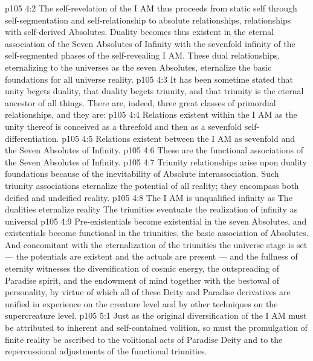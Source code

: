 \vs p105 4:2 The self\hyp{}revelation of the I AM thus proceeds from static self through self\hyp{}segmentation and self\hyp{}relationship to absolute relationships, relationships with self\hyp{}derived Absolutes. Duality becomes thus existent in the eternal association of the Seven Absolutes of Infinity with the sevenfold infinity of the self\hyp{}segmented phases of the self\hyp{}revealing I AM. These dual relationships, eternalizing to the universes as the seven Absolutes, eternalize the basic foundations for all universe reality.
\vs p105 4:3 It has been sometime stated that unity begets duality, that duality begets triunity, and that triunity is the eternal ancestor of all things. There are, indeed, three great classes of primordial relationships, and they are:
\vs p105 4:4 \bibnobreakspace {} Relations existent within the I AM as the unity thereof is conceived as a threefold and then as a sevenfold self\hyp{}differentiation.
\vs p105 4:5 \bibnobreakspace {} Relations existent between the I AM as sevenfold and the Seven Absolutes of Infinity.
\vs p105 4:6 \bibnobreakspace {} These are the functional associations of the Seven Absolutes of Infinity.
\vs p105 4:7 \pc Triunity relationships arise upon duality foundations because of the inevitability of Absolute interassociation. Such triunity associations eternalize the potential of all reality; they encompass both deified and undeified reality.
\vs p105 4:8 The I AM is unqualified infinity as  The dualities eternalize reality  The triunities eventuate the realization of infinity as universal 
\vs p105 4:9 Pre\hyp{}existentials become existential in the seven Absolutes, and existentials become functional in the triunities, the basic association of Absolutes. And concomitant with the eternalization of the triunities the universe stage is set --- the potentials are existent and the actuals are present --- and the fullness of eternity witnesses the diversification of cosmic energy, the outspreading of Paradise spirit, and the endowment of mind together with the bestowal of personality, by virtue of which all of these Deity and Paradise derivatives are unified in experience on the creature level and by other techniques on the supercreature level.
\vs p105 5:1 Just as the original diversification of the I AM must be attributed to inherent and self\hyp{}contained volition, so must the promulgation of finite reality be ascribed to the volitional acts of Paradise Deity and to the repercussional adjustments of the functional triunities.
